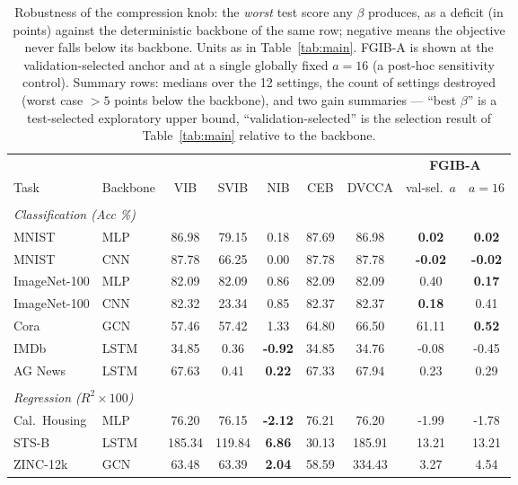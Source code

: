 \begin{table}[t]
\caption{Robustness of the compression knob: the \emph{worst} test score any $\beta$ produces, as a deficit (in points) against the deterministic backbone of the same row; negative means the objective never falls below its backbone. Units as in Table~\ref{tab:main}. FGIB-A is shown at the validation-selected anchor and at a single globally fixed $a=16$ (a post-hoc sensitivity control). Summary rows: medians over the 12 settings, the count of settings destroyed (worst case $>5$ points below the backbone), and two gain summaries --- ``best $\beta$'' is a test-selected exploratory upper bound, ``validation-selected'' is the selection result of Table~\ref{tab:main} relative to the backbone.}
\label{tab:robust}
\begin{center}\footnotesize
\begin{tabular}{llccccc|cc}
& & \multicolumn{5}{c|}{} & \multicolumn{2}{c}{\textbf{FGIB-A}} \\
Task & Backbone & VIB & SVIB & NIB & CEB & DVCCA & val-sel.\ $a$ & $a{=}16$ \\ \hline \\[-1.8ex]
\multicolumn{9}{l}{\emph{Classification (Acc \%)}} \\[0.3ex]
MNIST & MLP & 86.98 & 79.15 & 0.18 & 87.69 & 86.98 & \textbf{0.02} & \textbf{0.02} \\
MNIST & CNN & 87.78 & 66.25 & 0.00 & 87.78 & 87.78 & \textbf{-0.02} & \textbf{-0.02} \\
ImageNet-100 & MLP & 82.09 & 82.09 & 0.86 & 82.09 & 82.09 & 0.40 & \textbf{0.17} \\
ImageNet-100 & CNN & 82.32 & 23.34 & 0.85 & 82.37 & 82.37 & \textbf{0.18} & 0.41 \\
Cora & GCN & 57.46 & 57.42 & 1.33 & 64.80 & 66.50 & 61.11 & \textbf{0.52} \\
IMDb & LSTM & 34.85 & 0.36 & \textbf{-0.92} & 34.85 & 34.76 & -0.08 & -0.45 \\
AG News & LSTM & 67.63 & 0.41 & \textbf{0.22} & 67.33 & 67.94 & 0.23 & 0.29 \\
\\[-1.5ex]
\multicolumn{9}{l}{\emph{Regression ($R^2\times100$)}} \\[0.3ex]
Cal.\ Housing & MLP & 76.20 & 76.15 & \textbf{-2.12} & 76.21 & 76.20 & -1.99 & -1.78 \\
STS-B & LSTM & 185.34 & 119.84 & \textbf{6.86} & 30.13 & 185.91 & 13.21 & 13.21 \\
ZINC-12k & GCN & 63.48 & 63.39 & \textbf{2.04} & 58.59 & 334.43 & 3.27 & 4.54 \\

\end{tabular}
\end{center}
\end{table}
